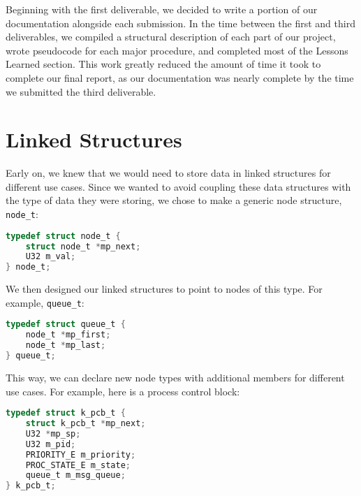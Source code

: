 \documentclass[12pt]{report}
\begin{document}
Beginning with the first deliverable, we decided to write a portion of our documentation alongside each submission. In the time between the first and third deliverables, we compiled a structural description of each part of our project, wrote pseudocode for each major procedure, and completed most of the Lessons Learned section. This work greatly reduced the amount of time it took to complete our final report, as our documentation was nearly complete by the time we submitted the third deliverable.

\section{Linked Structures}

Early on, we knew that we would need to store data in linked structures for different use cases. Since we wanted to avoid coupling these data structures with the type of data they were storing, we chose to make a generic node structure, \texttt{node_t}:

\begin{minipage}{\textwidth}
\begin{lstlisting}[language=C, frame=single]
typedef struct node_t {
    struct node_t *mp_next;
    U32 m_val;
} node_t;
\end{lstlisting}
\end{minipage}

We then designed our linked structures to point to nodes of this type. For example, \texttt{queue_t}:

\begin{minipage}{\textwidth}
\begin{lstlisting}[language=C, frame=single]
typedef struct queue_t {
    node_t *mp_first;
    node_t *mp_last;
} queue_t;
\end{lstlisting}
\end{minipage}

This way, we can declare new node types with additional members for different use cases. For example, here is a process control block:

\begin{minipage}{\textwidth}
\begin{lstlisting}[language=C, frame=single]
typedef struct k_pcb_t {
    struct k_pcb_t *mp_next;
    U32 *mp_sp;
    U32 m_pid;
    PRIORITY_E m_priority;
    PROC_STATE_E m_state;
    queue_t m_msg_queue;
} k_pcb_t;
\end{lstlisting}
\end{minipage}
\end{document}
